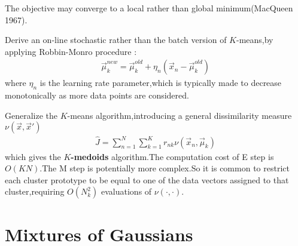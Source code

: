 The objective may converge to a local rather than global minimum(MacQueen 1967).

Derive an on-line stochastic rather than the batch version of $K$-means,by applying Robbin-Monro procedure :
\begin{align}
\vec{\mu}_k^{new} = 
\vec{\mu}_k^{old} + \eta_n(\vec{x}_n-\vec{\mu}_k^{old})
\end{align}
where $\eta_n$ is the learning rate parameter,which is typically made to decrease monotonically as more data points are considered.

Generalize the $K$-means algorithm,introducing a general dissimilarity measure $\nu(\vec{x},\vec{x}')$
\begin{align}
\hat{J} = \sum_{n=1}^{N}\sum_{k=1}^{K}r_{nk}\nu(\vec{x}_n,\vec{\mu}_k)
\end{align}
which gives the \textbf{$K$-medoids} algorithm.The computation cost of E step is $O(KN)$.The M step is potentially more complex.So it is common to restrict each cluster prototype to be equal to one of the data vectors assigned to that cluster,requiring $O(N_k^2)$ evaluations of $\nu(\cdot,\cdot)$.

\section{Mixtures of Gaussians}
